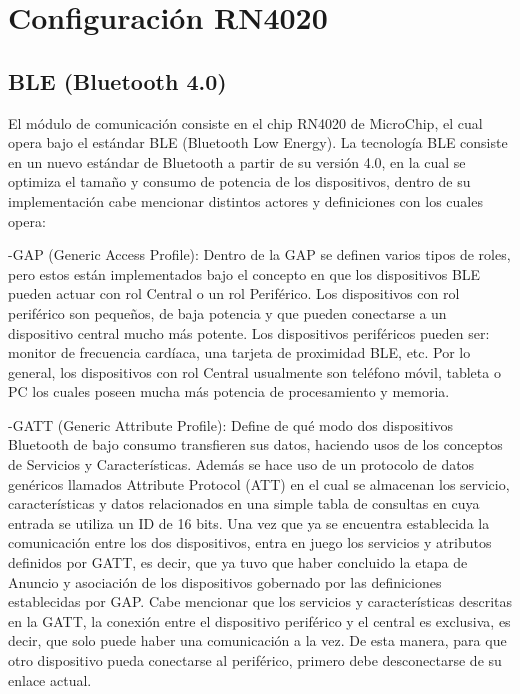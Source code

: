 \chapter{Configuración RN4020}\label{rn4020}

\section{BLE (Bluetooth 4.0)}

El módulo de comunicación consiste en el chip RN4020 de MicroChip, el cual opera bajo el estándar BLE (Bluetooth Low Energy). La tecnología BLE consiste en un nuevo estándar de Bluetooth a partir de su versión 4.0, en la cual se optimiza el tamaño y consumo de potencia de los dispositivos, dentro de su implementación cabe mencionar distintos actores y definiciones con los cuales opera:\newline

	-GAP (Generic Access Profile): Dentro de la GAP se definen varios tipos de roles, pero estos están implementados bajo el concepto en que los dispositivos BLE pueden actuar con rol Central o un rol Periférico. Los dispositivos con rol periférico son pequeños, de baja potencia y que pueden conectarse a un dispositivo central mucho más potente. Los dispositivos periféricos pueden ser: monitor de frecuencia cardíaca, una tarjeta de proximidad BLE, etc. Por lo general, los dispositivos con rol Central usualmente son teléfono móvil, tableta o PC los cuales poseen mucha más potencia de procesamiento y memoria.
	
	-GATT (Generic Attribute Profile): Define de qué modo dos dispositivos Bluetooth de bajo consumo transfieren sus datos, haciendo usos de los conceptos de Servicios y Características. Además se hace uso de un protocolo de datos genéricos llamados Attribute Protocol (ATT) en el cual se almacenan los servicio, características y datos relacionados en una simple tabla de consultas en cuya entrada se utiliza un ID de 16 bits. Una vez que ya se encuentra establecida la comunicación entre los dos dispositivos, entra en juego los servicios y atributos definidos por GATT, es decir, que ya tuvo que haber concluido la etapa de Anuncio y asociación de los dispositivos gobernado por las definiciones establecidas por GAP. Cabe mencionar que los servicios y características descritas en la GATT, la conexión entre el dispositivo periférico y el central es exclusiva, es decir, que solo puede haber una comunicación a la vez. De esta manera, para que otro dispositivo pueda conectarse al periférico, primero debe desconectarse de su enlace actual.
	
